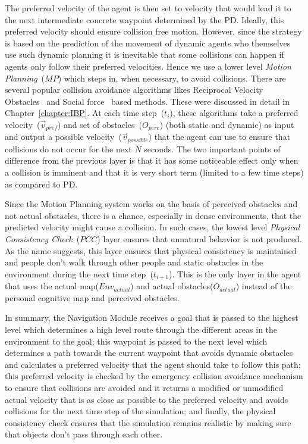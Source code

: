 The preferred velocity of the agent is then set to velocity that would lead it to the next intermediate concrete waypoint determined by the PD. Ideally, this preferred velocity should ensure collision free motion. However, since the strategy is based on the prediction of the movement of dynamic agents who themselves use such dynamic planning it is inevitable that some collisions can happen if agents only follow their preferred velocities. Hence we use a lower level \emph{Motion Planning}~($MP$) which steps in, when necessary, to avoid collisions. There are several popular collision avoidance algorithms likes Reciprocal Velocity Obstacles~\cite{Guy:2010ko,Yeh:2008tg} and Social force~\cite{Helbing:1995ie} based methods. These were discussed in detail in Chapter~\ref{chapter:IBP}. At each time step~($t_i$), these algorithms take a preferred velocity~($\vec{v}_{pref}$) and set of obstacles~($O_{perc}$) (both static and dynamic) as input and output a possible velocity~($\vec{v}_{possible}$) that the agent can use to ensure that collisions do not occur for the next $N$ seconds. The two important points of difference from the previous layer is that it has some noticeable effect only when a collision is imminent and that it is very short term (limited to a few time steps) as compared to PD.

Since the Motion Planning system works on the basis of perceived obstacles and not actual obstacles, there is a chance, especially in dense environments, that the predicted velocity might cause a collision. In such cases, the lowest level \emph{Physical Consistency Check}~($PCC$) layer ensures that unnatural behavior is not produced. As the name suggests, this layer ensures that physical consistency is maintained and people don't walk through other people and static obstacles in the environment during the next time step~($t_{i+1}$). This is the only layer in the agent that uses the actual map($Env_{actual}$) and actual obstacles($O_{actual}$) instead of the personal cognitive map and perceived obstacles.

In summary, the Navigation Module receives a goal that is passed to the highest level which determines a high level route through the different areas in the environment to the goal; this waypoint is passed to the next level which determines a path towards the current waypoint that avoids dynamic obstacles and calculates a preferred velocity that the agent should take to follow this path; this preferred velocity is checked by the emergency collision avoidance mechanism to ensure that collisions are avoided and it returns a modified or unmodified actual velocity that is as close as possible to the preferred velocity and avoids collisions for the next time step of the simulation; and finally, the physical consistency check ensures that the simulation remains realistic by making sure that objects don't pass through each other.

